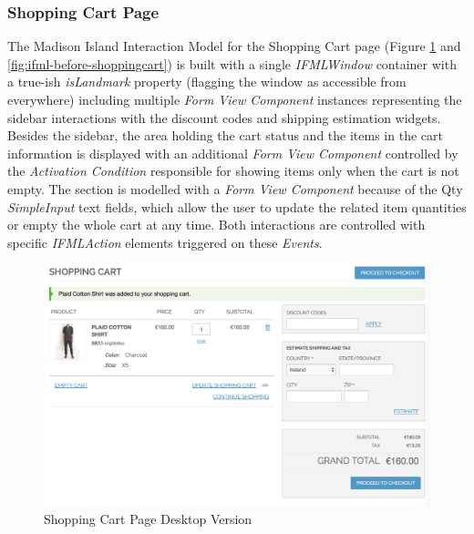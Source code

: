 \newpage
\subsubsection{Shopping Cart Page}
\label{shopping-cart-page-overview}
The Madison Island Interaction Model for the Shopping Cart page (Figure \ref{fig:desktop-before-shoppingcart} and \ref{fig:ifml-before-shoppingcart}) is  built with a single \textit{IFMLWindow} container with a true-ish \textit{isLandmark} property (flagging the window as accessible from everywhere) including multiple \textit{Form View Component} instances representing the sidebar interactions with the discount codes and shipping estimation widgets. Besides the sidebar, the area holding the cart status and the items in the cart information is displayed with an additional \textit{Form View Component} controlled by the \textit{Activation Condition} responsible for showing items only when the cart is not empty. The section is modelled with a \textit{Form View Component} because of the Qty \textit{SimpleInput} text fields, which allow the user to update the related item quantities or empty the whole cart at any time. Both interactions are controlled with specific \textit{IFMLAction} elements triggered on these \textit{Events}.

\vspace{0.5cm}
\begin{figure}[H]
  \centering
    \includegraphics[width=14cm]{images/diagrams/before/desktop-shoppingcart.png}
  \caption{Shopping Cart Page Desktop Version}
  \label{fig:desktop-before-shoppingcart}
\end{figure}

